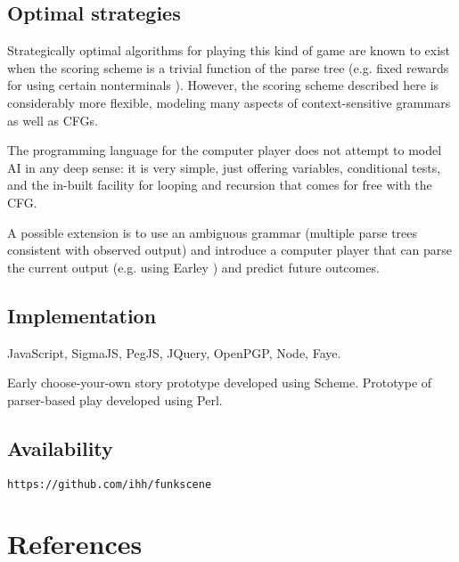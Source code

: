 \documentclass{acm_proc_article-sp}
\begin{document}
\subsection{Optimal strategies}

Strategically optimal algorithms for playing this kind of game are known to exist when the scoring scheme is a trivial function of the parse tree (e.g. fixed rewards for using certain nonterminals \cite{DBLP:conf/icalp/EtessamiWY08}).
However, the scoring scheme described here is considerably more flexible, modeling many aspects of context-sensitive grammars as well as CFGs.

The programming language for the computer player does not attempt to model AI in any deep sense:
it is very simple, just offering variables, conditional tests, and the in-built facility for looping and recursion that comes for free with the CFG.

A possible extension is to use an ambiguous grammar (multiple parse trees consistent with observed output)
and introduce a computer player that can parse the current output (e.g. using Earley \cite{Stolcke}) and predict future outcomes.

\subsection{Implementation}

JavaScript, SigmaJS, PegJS, JQuery, OpenPGP, Node, Faye.

Early choose-your-own story prototype developed using Scheme.
Prototype of parser-based play developed using Perl.


\subsection{Availability}

{\tt https://github.com/ihh/funkscene}

\section{References}




\balancecolumns
\end{document}
